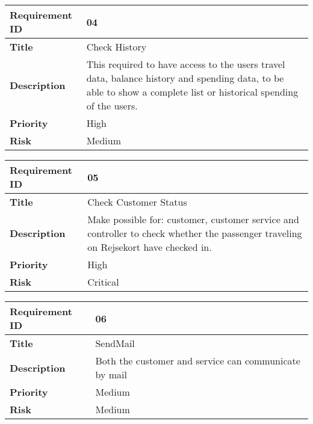 \begin{center}
	\def\arraystretch{1.5}%
    \begin{tabular}{ | p{5cm} | p{5cm} |}
    \hline
    	\textbf{Requirement ID} & 04 \\ \hline
		\textbf{Title} & Check History\\ \hline
		\textbf{Description} & This required to have access to the users travel data, balance history and spending data, to be able to show a complete list or historical spending of the users.\\ \hline
		\textbf{Priority} & High\\ \hline
		\textbf{Risk} & Medium\\
      \hline
    \end{tabular}
\end{center}

\begin{center}
	\def\arraystretch{1.5}%
    \begin{tabular}{ | p{5cm} | p{5cm} |}
    \hline
    	\textbf{Requirement ID} & 05 \\ \hline
		\textbf{Title} & Check Customer Status\\ \hline
		\textbf{Description} & Make possible for: customer, customer service and controller to check whether the passenger traveling on Rejsekort have checked in.\\ \hline
		\textbf{Priority} & High\\ \hline
		\textbf{Risk} & Critical\\
      \hline
    \end{tabular}
\end{center}

\begin{center}
	\def\arraystretch{1.5}%
    \begin{tabular}{ | p{5cm} | p{5cm} |}
    \hline
    	\textbf{Requirement ID} & 06 \\ \hline
		\textbf{Title} & SendMail\\ \hline
		\textbf{Description} & Both the customer and service can communicate by mail\\ \hline
		\textbf{Priority} & Medium\\ \hline
		\textbf{Risk} & Medium\\
      \hline
    \end{tabular}
\end{center}

